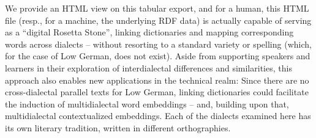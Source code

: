 \documentclass[11pt]{article}
\begin{document}
\begin{enumerate}
We provide an HTML view on this tabular export, and for a human, this HTML file (resp., for a machine, the underlying RDF data) is actually capable of serving as a ``digital Rosetta Stone'', linking dictionaries and mapping corresponding words across dialects -- without resorting to a standard variety or spelling (which, for the case of Low German, does not exist). 
Aside from supporting speakers and learners in their exploration of interdialectal differences and similarities, this approach also enables new applications in the technical realm: Since there are no cross-dialectal parallel texts for Low German, linking dictionaries could facilitate the induction of multidialectal word embeddings -- and, building upon that, multidialectal contextualized embeddings. Each of the dialects examined here has its own literary tradition, written in different orthographies.



\end{enumerate}
\end{document}
